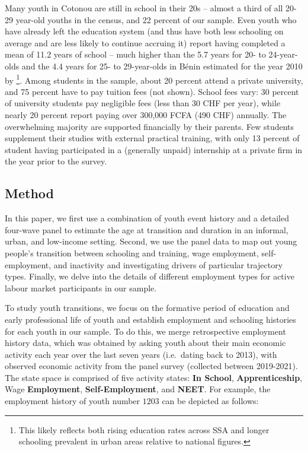 \documentclass[
  a4paper, twoside, 12pt]{book}
\begin{document}
Many youth in Cotonou are still in school in their 20s -- almost a third of all 20-29 year-old youths in the census, and 22 percent of our sample. Even youth who have already left the education system (and thus have both less schooling on average and are less likely to continue accruing it) report having completed a mean of 11.2 years of school -- much higher than the 5.7 years for 20- to 24-year-olds and the 4.4 years for 25- to 29-year-olds in Bénin estimated for the year 2010 by \textcite{barro2013}\footnote{This likely reflects both rising education rates across SSA and longer schooling prevalent in urban areas relative to national figures.}. Among students in the sample, about 20 percent attend a private university, and 75 percent have to pay tuition fees (not shown). School fees vary: 30 percent of university students pay negligible fees (less than 30 CHF per year), while nearly 20 percent report paying over 300,000 FCFA (490 CHF) annually. The overwhelming majority are supported financially by their parents. Few students supplement their studies with external practical training, with only 13 percent of student having participated in a (generally unpaid) internship at a private firm in the year prior to the survey.

\hypertarget{survey-method}{%
\subsection*{Method}\label{survey-method}}

In this paper, we first use a combination of youth event history and a detailed four-wave panel to estimate the age at transition and duration in an informal, urban, and low-income setting. Second, we use the panel data to map out young people's transition between schooling and training, wage employment, self-employment, and inactivity and investigating drivers of particular trajectory types. Finally, we delve into the details of different employment types for active labour market participants in our sample.

To study youth transitions, we focus on the formative period of education and early professional life of youth and establish employment and schooling histories for each youth in our sample. To do this, we merge retrospective employment history data, which was obtained by asking youth about their main economic activity each year over the last seven years (i.e.~dating back to 2013), with observed economic activity from the panel survey (collected between 2019-2021). The state space is comprised of five activity states: \textbf{In School}, \textbf{Apprenticeship}, Wage \textbf{Employment}, \textbf{Self-Employment}, and \textbf{NEET}. For example, the employment history of youth number \(1203\) can be depicted as follows:
\end{document}
